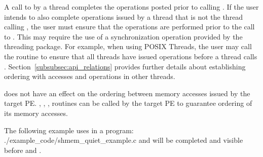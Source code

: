 \begin{apidefinition}
{    A call to  by a thread completes the operations posted
    prior to calling . If the user intends to also complete
    operations issued by a thread that is not the thread calling
    , the user must ensure that the operations are performed
    prior to the call to . This may require the use of a
    synchronization operation provided by the threading package. For example,
    when using POSIX Threads, the user may call the
     routine to ensure that all threads have issued
    operations before a thread calls .
    Section~\ref{subsubsec:api_relations} provides further details about
    establishing ordering with accesses and operations in other threads.

     does not have an effect on the ordering between memory
    accesses issued by the target \ac{PE}. ,
    , ,  routines
    can be called by the target \ac{PE} to guarantee ordering of its memory accesses.
}

\begin{apiexamples}

\apicexample
    {The following example uses  in a \Cstd[11] program: }
    {./example_code/shmem_quiet_example.c}
    { and  will be completed and visible before 
    and .}
\end{apiexamples}

\end{apidefinition}
